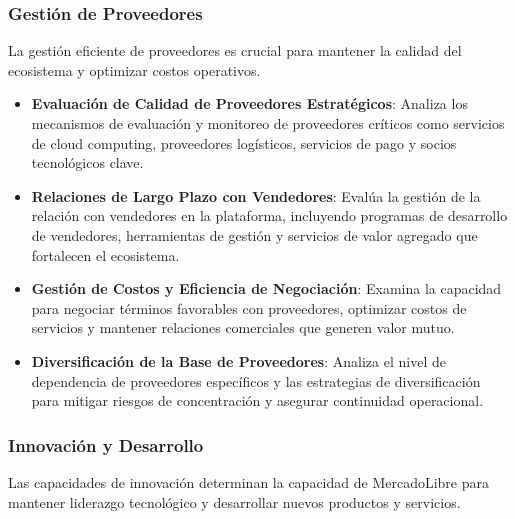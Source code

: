 \subsubsection{Gestión de Proveedores}

La gestión eficiente de proveedores es crucial para mantener la calidad del ecosistema y optimizar costos operativos.

\begin{itemize}
\item \textbf{Evaluación de Calidad de Proveedores Estratégicos}: Analiza los mecanismos de evaluación y monitoreo de proveedores críticos como servicios de cloud computing, proveedores logísticos, servicios de pago y socios tecnológicos clave.

\item \textbf{Relaciones de Largo Plazo con Vendedores}: Evalúa la gestión de la relación con vendedores en la plataforma, incluyendo programas de desarrollo de vendedores, herramientas de gestión y servicios de valor agregado que fortalecen el ecosistema.

\item \textbf{Gestión de Costos y Eficiencia de Negociación}: Examina la capacidad para negociar términos favorables con proveedores, optimizar costos de servicios y mantener relaciones comerciales que generen valor mutuo.

\item \textbf{Diversificación de la Base de Proveedores}: Analiza el nivel de dependencia de proveedores específicos y las estrategias de diversificación para mitigar riesgos de concentración y asegurar continuidad operacional.
\end{itemize}

\subsubsection{Innovación y Desarrollo}

Las capacidades de innovación determinan la capacidad de MercadoLibre para mantener liderazgo tecnológico y desarrollar nuevos productos y servicios.

